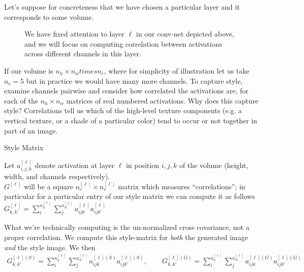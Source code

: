 \documentclass[12pt]{article}
\begin{document}
Let's suppose for concreteness that we have chosen a particular layer and it corresponds to some volume.
\begin{figure}[h]
  \centering
  \caption{\footnotesize We have fixed attention to layer $\ell$ in our conv-net depicted above, and we will focus on computing correlation between activations across different channels in this layer.}
\end{figure}
If our volume is $n_h \times n_w times n_c$, where for simplicity of illustration let us take $n_c = 5$ but in practice we would have many more channels. To capture style, examine channels pairwise and consider how correlated the activations are, for each of the $n_h \times n_w$ matrices of real numbered activations. Why does this capture style? Correlations tell us which of the high-level texture components (e.g. a vertical texture, or a shade of a particular color) tend to occur or not together in part of an image.
\begin{algorithm}
  \caption{Style Matrix}
  Let $a^{[\ell]}_{i,j,k}$ denote activation at layer $\ell$ in position $i,j,k$     of the volume (height, width, and channels respectively). \\
  $G^{[\ell]}$ will be a square $n_c^{[\ell]} \times n_c^{[\ell]}$ matrix which measures ``correlations''; in particular for a particular entry of our style matrix we can compute it as follows $G_{k,k'}^{[\ell]} = \sum_i^{n_h^{[\ell]}} \sum_j^{n_w^{[\ell]}} a^{[\ell]}_{ijk} a^{[\ell]}_{ijk'}$
\end{algorithm}
What we're technically computing is the un-normalized cross covariance, not a proper correlation. We compute this style-matrix for \emph{both} the generated image \emph{and} the style image. We then
\begin{align*}
  G_{k,k'}^{[\ell](S)} = \sum_i^{n_h^{[\ell]}} \sum_j^{n_w^{[\ell]}}   a^{[\ell](S)}_{ijk} a^{[\ell](S)}_{ijk'}, \hspace{25pt}
  G_{k,k'}^{[\ell](G)} = \sum_i^{n_h^{[\ell]}} \sum_j^{n_w^{[\ell]}} a^{[\ell](G)}_{ijk} a^{[\ell](G)}_{ijk'}
\end{align*}
\end{document}
